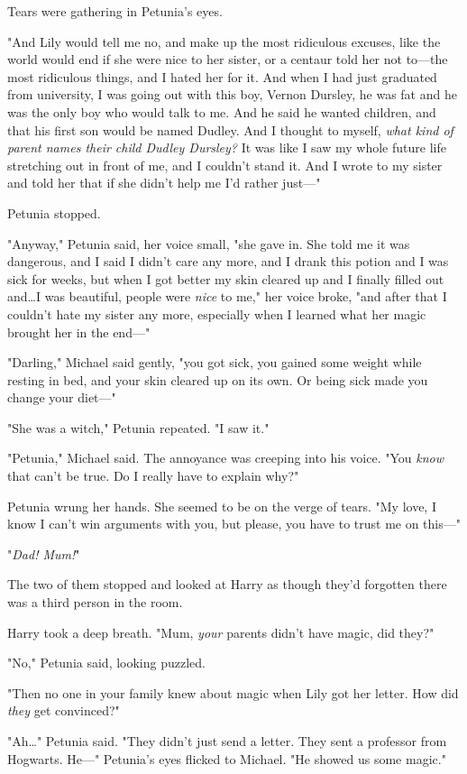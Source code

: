 Tears were gathering in Petunia's eyes.

"And Lily would tell me no, and make up the most ridiculous excuses, like the
world would end if she were nice to her sister, or a centaur told her not
to—the most ridiculous things, and I hated her for it. And when I had just
graduated from university, I was going out with this boy, Vernon Dursley, he
was fat and he was the only boy who would talk to me. And he said he wanted
children, and that his first son would be named Dudley. And I thought to
myself, \emph{what kind of parent names their child Dudley Dursley?} It was
like I saw my whole future life stretching out in front of me, and I couldn't
stand it. And I wrote to my sister and told her that if she didn't help me I'd
rather just—"

Petunia stopped.

"Anyway," Petunia said, her voice small, "she gave in. She told me it was
dangerous, and I said I didn't care any more, and I drank this potion and I was
sick for weeks, but when I got better my skin cleared up and I finally filled
out and…I was beautiful, people were \emph{nice} to me," her voice
broke, "and after that I couldn't hate my sister any more, especially when I
learned what her magic brought her in the end—"

"Darling," Michael said gently, "you got sick, you gained some weight while
resting in bed, and your skin cleared up on its own. Or being sick made you
change your diet—"

"She was a witch," Petunia repeated. "I saw it."

"Petunia," Michael said. The annoyance was creeping into his voice. "You
\emph{know} that can't be true. Do I really have to explain why?"

Petunia wrung her hands. She seemed to be on the verge of tears. "My love, I
know I can't win arguments with you, but please, you have to trust me on
this—"

"\emph{Dad! Mum!}"

The two of them stopped and looked at Harry as though they'd forgotten there
was a third person in the room.

Harry took a deep breath. "Mum, \emph{your} parents didn't have magic, did
they?"

"No," Petunia said, looking puzzled.

"Then no one in your family knew about magic when Lily got her letter. How did
\emph{they} get convinced?"

"Ah…" Petunia said. "They didn't just send a letter. They sent a
professor from Hogwarts. He—" Petunia's eyes flicked to Michael. "He showed
us some magic."

